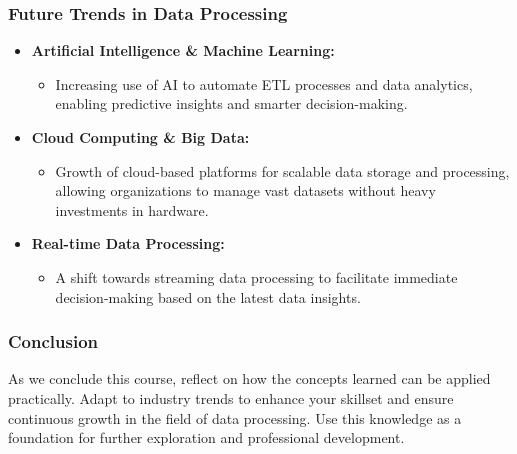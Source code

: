\documentclass{beamer}
\begin{document}
\begin{frame}[fragile]
    \frametitle{Future Trends in Data Processing}

    \begin{itemize}
        \item \textbf{Artificial Intelligence \& Machine Learning:} 
              \begin{itemize}
                  \item Increasing use of AI to automate ETL processes and data analytics, enabling predictive insights and smarter decision-making.
              \end{itemize}

        \item \textbf{Cloud Computing \& Big Data:} 
              \begin{itemize}
                  \item Growth of cloud-based platforms for scalable data storage and processing, allowing organizations to manage vast datasets without heavy investments in hardware.
              \end{itemize}

        \item \textbf{Real-time Data Processing:} 
              \begin{itemize}
                  \item A shift towards streaming data processing to facilitate immediate decision-making based on the latest data insights.
              \end{itemize}
    \end{itemize}
\end{frame}

\begin{frame}[fragile]
    \frametitle{Conclusion}

    As we conclude this course, reflect on how the concepts learned can be applied practically. 
    Adapt to industry trends to enhance your skillset and ensure continuous growth in the field of data processing. 
    Use this knowledge as a foundation for further exploration and professional development.
\end{frame}
\end{document}
